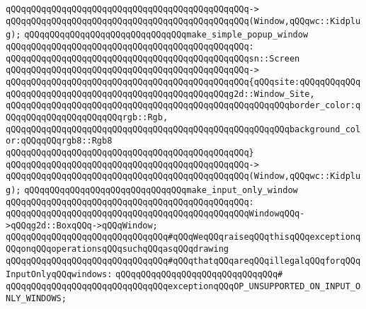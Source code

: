 \verb|qQQqqQQqqQQqqQQqqQQqqQQqqQQqqQQqqQQqqQQqqQQqqQQq->|\newline
\verb|qQQqqQQqqQQqqQQqqQQqqQQqqQQqqQQqqQQqqQQqqQQqqQQq(Window,qQQqwc::Kidplug);|\newline
\newline
\verb|qQQqqQQqqQQqqQQqqQQqqQQqqQQqqQQqmake_simple_popup_window|\newline
\verb|qQQqqQQqqQQqqQQqqQQqqQQqqQQqqQQqqQQqqQQqqQQqqQQq:|\newline
\verb|qQQqqQQqqQQqqQQqqQQqqQQqqQQqqQQqqQQqqQQqqQQqqQQqsn::Screen|\newline
\verb|qQQqqQQqqQQqqQQqqQQqqQQqqQQqqQQqqQQqqQQqqQQqqQQq->|\newline
\verb|qQQqqQQqqQQqqQQqqQQqqQQqqQQqqQQqqQQqqQQqqQQqqQQq{qQQqsite:qQQqqQQqqQQqqQQqqQQqqQQqqQQqqQQqqQQqqQQqqQQqqQQqqQQqqQQqg2d::Window_Site,|\newline
\verb|qQQqqQQqqQQqqQQqqQQqqQQqqQQqqQQqqQQqqQQqqQQqqQQqqQQqqQQqborder_color:qQQqqQQqqQQqqQQqqQQqqQQqrgb::Rgb,|\newline
\verb|qQQqqQQqqQQqqQQqqQQqqQQqqQQqqQQqqQQqqQQqqQQqqQQqqQQqqQQqbackground_color:qQQqqQQqrgb8::Rgb8|\newline
\verb|qQQqqQQqqQQqqQQqqQQqqQQqqQQqqQQqqQQqqQQqqQQqqQQq}|\newline
\verb|qQQqqQQqqQQqqQQqqQQqqQQqqQQqqQQqqQQqqQQqqQQqqQQq->|\newline
\verb|qQQqqQQqqQQqqQQqqQQqqQQqqQQqqQQqqQQqqQQqqQQqqQQq(Window,qQQqwc::Kidplug);|\newline
\newline
\verb|qQQqqQQqqQQqqQQqqQQqqQQqqQQqqQQqmake_input_only_window|\newline
\verb|qQQqqQQqqQQqqQQqqQQqqQQqqQQqqQQqqQQqqQQqqQQqqQQq:|\newline
\verb|qQQqqQQqqQQqqQQqqQQqqQQqqQQqqQQqqQQqqQQqqQQqqQQqWindowqQQq->qQQqg2d::BoxqQQq->qQQqWindow;|\newline
\newline
\verb|qQQqqQQqqQQqqQQqqQQqqQQqqQQqqQQq#qQQqWeqQQqraiseqQQqthisqQQqexceptionqQQqonqQQqoperationsqQQqsuchqQQqasqQQqdrawing|\newline
\verb|qQQqqQQqqQQqqQQqqQQqqQQqqQQqqQQq#qQQqthatqQQqareqQQqillegalqQQqforqQQqInputOnlyqQQqwindows:|\newline
\verb|qQQqqQQqqQQqqQQqqQQqqQQqqQQqqQQq#|\newline
\verb|qQQqqQQqqQQqqQQqqQQqqQQqqQQqqQQqexceptionqQQqOP_UNSUPPORTED_ON_INPUT_ONLY_WINDOWS;|\newline
\newline
